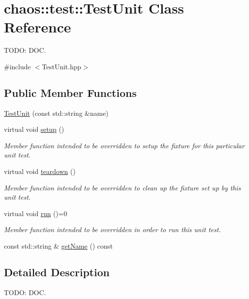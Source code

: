 \hypertarget{classchaos_1_1test_1_1_test_unit}{\section{chaos\-:\-:test\-:\-:Test\-Unit Class Reference}
\label{classchaos_1_1test_1_1_test_unit}
}


T\-O\-D\-O\-: D\-O\-C.  




{\ttfamily \#include $<$Test\-Unit.\-hpp$>$}

\subsection*{Public Member Functions}
\begin{DoxyCompactItemize}
\item 
\hyperlink{classchaos_1_1test_1_1_test_unit_a08d73d7b6ad46db691afbd6b066567f3}{Test\-Unit} (const std\-::string \&name)
\item 
virtual void \hyperlink{classchaos_1_1test_1_1_test_unit_abba8ef36b76b0780f331025e0721072e}{setup} ()
\begin{DoxyCompactList}\small\item\em Member function intended to be overridden to setup the fixture for this particular unit test. \end{DoxyCompactList}\item 
virtual void \hyperlink{classchaos_1_1test_1_1_test_unit_a9dd2b8814fe9b3f6753d464f5ddaa2a4}{teardown} ()
\begin{DoxyCompactList}\small\item\em Member function intended to be overridden to clean up the fixture set up by this unit test. \end{DoxyCompactList}\item 
virtual void \hyperlink{classchaos_1_1test_1_1_test_unit_a7c46611836ac7a9a527115098f83564c}{run} ()=0
\begin{DoxyCompactList}\small\item\em Member function intended to be overridden in order to run this unit test. \end{DoxyCompactList}\item 
const std\-::string \& \hyperlink{classchaos_1_1test_1_1_test_unit_a34bc9edcf21da9276d7798b3fde34244}{get\-Name} () const 
\end{DoxyCompactItemize}


\subsection{Detailed Description}
T\-O\-D\-O\-: D\-O\-C. 

